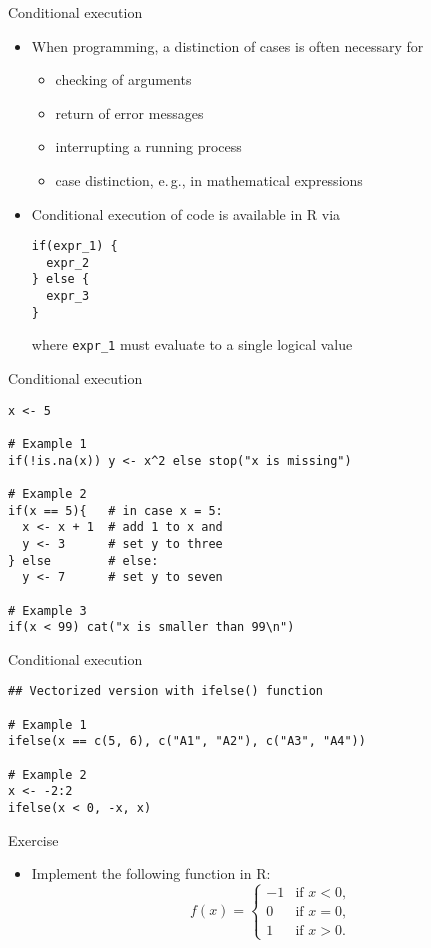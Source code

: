 \documentclass[aspectratio=169]{beamer}
\begin{document}
\begin{frame}[fragile]{Conditional execution}
  \begin{itemize}
    \item When programming, a distinction of cases is often necessary for
      \begin{itemize}
        \item checking of arguments
        \item return of error messages
        \item interrupting a running process
        \item case distinction, e.\,g., in mathematical expressions
      \end{itemize}

    \item Conditional execution of code is available in R via


\begin{lstlisting}
if(expr_1) {
  expr_2
} else {
  expr_3
}
\end{lstlisting}

where \verb+expr_1+ must evaluate to a single logical value
  \end{itemize}
\end{frame}

\begin{frame}[fragile]{Conditional execution}
\begin{lstlisting}
x <- 5

# Example 1
if(!is.na(x)) y <- x^2 else stop("x is missing")

# Example 2
if(x == 5){   # in case x = 5:
  x <- x + 1  # add 1 to x and
  y <- 3      # set y to three
} else        # else:
  y <- 7      # set y to seven

# Example 3
if(x < 99) cat("x is smaller than 99\n")
\end{lstlisting}
  \nocite{Ligges2008}
\end{frame}

\begin{frame}[fragile]{Conditional execution}
\begin{lstlisting}
## Vectorized version with ifelse() function

# Example 1
ifelse(x == c(5, 6), c("A1", "A2"), c("A3", "A4"))

# Example 2
x <- -2:2
ifelse(x < 0, -x, x)
\end{lstlisting}
\end{frame}

\begin{frame}{}
  \begin{block}{Exercise}
  \begin{itemize}
 \item Implement the following function in R:
\[
f(x) =
\begin{cases}
 -1 & \text{if } x < 0,\\
  0 & \text{if } x = 0,\\
  1 & \text{if } x > 0.
\end{cases}
\]
  \end{itemize}
  \end{block}
\end{frame}
\end{document}
